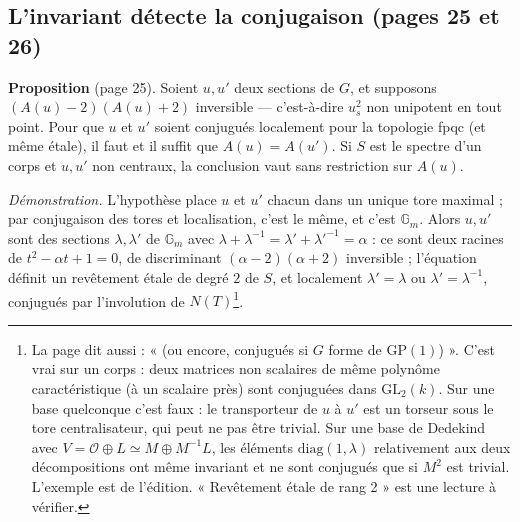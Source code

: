 \documentclass[11pt,a4paper]{article}
\begin{document}
\subsection*{L'invariant détecte la conjugaison (pages 25 et 26)}

\textbf{Proposition} (page 25). Soient $u, u'$ deux sections de $G$, et
supposons $(A(u) - 2)(A(u) + 2)$ inversible --- c'est-à-dire $u_s^2$ non
unipotent en tout point. Pour que $u$ et $u'$ soient conjugués localement
pour la topologie fpqc (et même étale), il faut et il suffit que $A(u) =
A(u')$. Si $S$ est le spectre d'un corps et $u, u'$ non centraux, la
conclusion vaut sans restriction sur $A(u)$.

\emph{Démonstration.} L'hypothèse place $u$ et $u'$ chacun dans un unique tore
maximal ; par conjugaison des tores et localisation, c'est le même, et c'est
$\mathbb{G}_m$. Alors $u, u'$ sont des sections $\lambda, \lambda'$ de
$\mathbb{G}_m$ avec $\lambda + \lambda^{-1} = \lambda' + \lambda'^{-1} =
\alpha$ : ce sont deux racines de $t^2 - \alpha t + 1 = 0$, de discriminant
$(\alpha - 2)(\alpha + 2)$ inversible ; l'équation définit un revêtement étale
de degré $2$ de $S$, et localement $\lambda' = \lambda$ ou $\lambda' =
\lambda^{-1}$, conjugués par l'involution de $N(T)$\footnote{La page dit
aussi : « (ou encore, conjugués si $G$ forme de $\mathrm{GP}(1)$) ». C'est
vrai sur un corps : deux matrices non scalaires de même polynôme
caractéristique (à un scalaire près) sont conjuguées dans
$\mathrm{GL}_2(k)$. Sur une base quelconque c'est faux : le transporteur de $u$
à $u'$ est un torseur sous le tore centralisateur, qui peut ne pas être
trivial. Sur une base de Dedekind avec $V = \mathcal{O} \oplus L \simeq M
\oplus M^{-1}L$, les éléments $\mathrm{diag}(1, \lambda)$ relativement aux
deux décompositions ont même invariant et ne sont conjugués que si $M^2$ est
trivial. L'exemple est de l'édition. « Revêtement étale de rang 2 » est une
lecture à vérifier.}.
\end{document}
